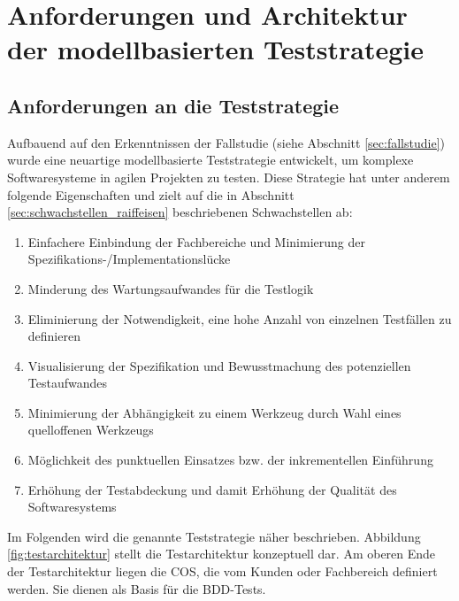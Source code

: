 \chapter{Anforderungen und Architektur der modellbasierten Teststrategie}
\label{sec:results}
\section{Anforderungen an die Teststrategie}
\label{sec:anforderungen_teststrategie}
Aufbauend auf den Erkenntnissen der Fallstudie (siehe Abschnitt \ref{sec:fallstudie}) wurde eine neuartige modellbasierte Teststrategie entwickelt, um komplexe Softwaresysteme in agilen Projekten zu testen. Diese Strategie hat unter anderem folgende Eigenschaften und zielt auf die in Abschnitt \ref{sec:schwachstellen_raiffeisen} beschriebenen Schwachstellen ab:

\begin{enumerate}
\item Einfachere Einbindung der Fachbereiche und Minimierung der Spezifikations-/Implementationslücke
\item Minderung des Wartungsaufwandes für die Testlogik
\item Eliminierung der Notwendigkeit, eine hohe Anzahl von einzelnen Testfällen zu definieren
\item Visualisierung der Spezifikation und Bewusstmachung des potenziellen Testaufwandes
\item Minimierung der Abhängigkeit zu einem Werkzeug durch Wahl eines quelloffenen Werkzeugs
\item Möglichkeit des punktuellen Einsatzes bzw. der inkrementellen Einführung
\item Erhöhung der Testabdeckung und damit Erhöhung der Qualität des Softwaresystems
\end{enumerate}

Im Folgenden wird die genannte Teststrategie näher beschrieben. Abbildung \ref{fig:testarchitektur} stellt die Testarchitektur konzeptuell dar. Am oberen Ende der Testarchitektur liegen die \gls{COS}, die vom Kunden oder Fachbereich definiert werden. Sie dienen als Basis für die BDD-Tests. 

